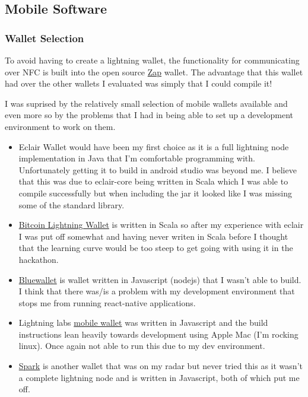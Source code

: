\documentclass[a4paper]{article}
\begin{document}
\subsection{Mobile Software}
\subsubsection{Wallet Selection}
To avoid having to create a lightning wallet, the functionality for communicating over
NFC is built into the open source \href{https://github.com/LN-Zap/zap-android}{Zap}
wallet.  The advantage that this wallet had over the other wallets I evaluated was
simply that I could compile it!

I was suprised by the relatively small selection of mobile wallets available and
even more so by the problems that I had in being able to set up a development
environment to work on them.

\begin{itemize}
\item Eclair Wallet would have been my first choice as it is a full lightning node
implementation in Java that I'm comfortable programming with.  Unfortunately getting it
to build in android studio was beyond me.  I believe that this was due to eclair-core
being written in Scala which I was able to compile successfully but when including the
jar it looked like I was missing some of the standard library.

\item \href{https://github.com/btcontract/lnwallet}{Bitcoin Lightning Wallet} is written
in Scala so after my experience with eclair I was put off somewhat and having never
writen in Scala before I thought that the learning curve would be too steep to get going
with using it in the hackathon.

\item \href{https://github.com/bluewallet/bluewallet}{Bluewallet} is wallet written in
Javascript (nodejs) that I wasn't able to build. I think that there was/is a problem
with my development environment that stops me from running react-native applications.

\item Lightning labs \href{https://github.com/lightninglabs/lightning-app}{mobile wallet}
was written in Javascript and the build instructions lean heavily towards development
using Apple Mac (I'm rocking linux). Once again not able to run this due to my dev
environment.

\item \href{}{Spark} is another wallet that was on my radar but never tried this as it
wasn't a complete lightning node and is written in Javascript, both of which put me off.
\end{itemize}
\end{document}
